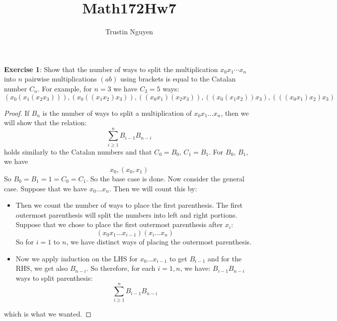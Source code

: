 \documentclass{article}
\title{Math172Hw7}
\author{Trustin Nguyen}
\begin{document}
    \maketitle

\reversemarginpar

\textbf{Exercise 1}: Show that the number of ways to split the multiplication $x_{0}x_{1}\cdots x_{n}$ into $n$ pairwise multiplications $(ab)$ using brackets is equal to the Catalan number $C_{n}$. For example, for $n = 3$ we have $C_{3} = 5$ ways:
    \begin{equation*}
        (x_{0}(x_{1}(x_{2}x_{3}))), (x_{0}((x_{1}x_{2})x_{3})), ((x_{0}x_{1})(x_{2}x_{3})), ((x_{0}(x_{1}x_{2}))x_{3}), (((x_{0}x_{1})x_{2})x_{3})
    \end{equation*}
        \begin{proof}
            If $B_{n}$ is the number of ways to split a multiplication of $x_{0}x_{1}\ldots x_{n}$, then we will show that the relation:
                \begin{equation*}
                    \sum_{i \geq 1}^{n} B_{i - 1}B_{n - i}
                \end{equation*}
            holds similarly to the Catalan numbers and that $C_{0} = B_{0}$, $C_{1} = B_{1}$. For $B_{0}$, $B_{1}$, we have
                \begin{equation*}
                    x_{0}, (x_{0}, x_{1})
                \end{equation*}
            So $B_{0} = B_{1} = 1 = C_{0} = C_{1}$. So the base case is done. Now consider the general case. Suppose that we have $x_{0} \ldots x_{n}$. Then we will count this by:
                \begin{itemize}
                    \item Then we count the number of ways to place the first parenthesis. The first outermost parenthesis will split the numbers into left and right portions. Suppose that we chose to place the first outermost parenthesis after $x_{i}$:
                        \begin{equation*}
                            (x_{0}x_{1} \ldots x_{i - 1})(x_{i}\ldots x_{n})
                        \end{equation*}
                    So for $i = 1$ to $n$, we have distinct ways of placing the outermost parenthesis.

                    \item Now we apply induction on the LHS for $x_{0} \ldots x_{i - 1}$ to get $B_{i - 1}$ and for the RHS, we get also $B_{n -i}$. So therefore, for each $i = 1, n$, we have: $B_{i - 1}B_{n - i}$ ways to split parenthesis:
                        \begin{equation*}
                            \sum_{i \geq 1}^{n}B_{i - 1}B_{n - i}
                        \end{equation*}
                \end{itemize}
            which is what we wanted.
        \end{proof}
\end{document}
